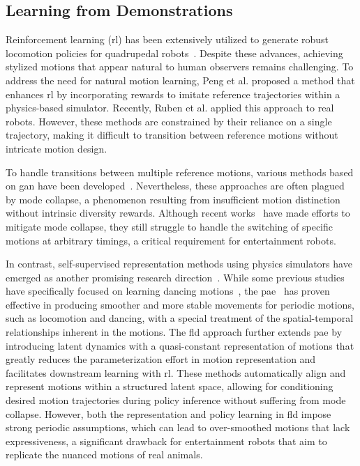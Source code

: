 \subsection{Learning from Demonstrations}
Reinforcement learning (\ac{rl}) has been extensively utilized to generate robust locomotion policies for quadrupedal robots~\cite{anymal_terrain, anymal_perceptive, Choi2023-cf}.
Despite these advances, achieving stylized motions that appear natural to human observers remains challenging.
To address the need for natural motion learning, Peng et al.\cite{deepmimic} proposed a method that enhances \ac{rl} by incorporating rewards to imitate reference trajectories within a physics-based simulator.
Recently, Ruben et al.\cite{disney_learning} applied this approach to real robots.
However, these methods are constrained by their reliance on a single trajectory, making it difficult to transition between reference motions without intricate motion design.

To handle transitions between multiple reference motions, various methods based on \ac{gan} have been developed~\cite{amp_org, amp_quadruped_robot}.
Nevertheless, these approaches are often plagued by mode collapse, a phenomenon resulting from insufficient motion distinction without intrinsic diversity rewards.
Although recent works~\cite{peng2022ase, li2023versatile, luo2023perpetual, tessler2023calm} have made efforts to mitigate mode collapse, they still struggle to handle the switching of specific motions at arbitrary timings, a critical requirement for entertainment robots.

In contrast, self-supervised representation methods using physics simulators have emerged as another promising research direction~\cite{motion_representation}.
While some previous studies have specifically focused on learning dancing motions~\cite{ai_choreographer, transflower}, the \ac{pae}~\cite{periodic_autoencoder} has proven effective in producing smoother and more stable movements for periodic motions, such as locomotion and dancing, with a special treatment of the spatial-temporal relationships inherent in the motions.
The \ac{fld} approach\cite{fld} further extends \ac{pae} by introducing latent dynamics with a quasi-constant representation of motions that greatly reduces the parameterization effort in motion representation and facilitates downstream learning with \ac{rl}.
These methods automatically align and represent motions within a structured latent space, allowing for conditioning desired motion trajectories during policy inference without suffering from mode collapse.
However, both the representation and policy learning in \ac{fld} impose strong periodic assumptions, which can lead to over-smoothed motions that lack expressiveness, a significant drawback for entertainment robots that aim to replicate the nuanced motions of real animals.
